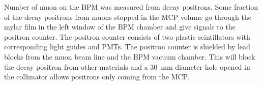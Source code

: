 \documentclass[preprint,3p,twocolumn]{elsarticle}
\begin{document}
Number of muon on the BPM was measured from decay positrons.
Some fraction of the decay positrons from muons stopped in the MCP volume go through the mylar film in the left window of the BPM chamber and give signals to the positron counter. 
The positron counter consists of two plastic scintillators with corresponding light guides and PMTs. %
The positron counter is shielded by lead blocks from the muon beam line and the BPM vacuum chamber. This will block the decay positron from other materials and a \SI{30}{\mm} diameter hole opened in the collimator allows positrons only coming from the MCP.
\end{document}
